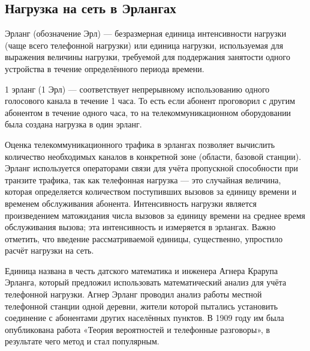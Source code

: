 \subsection{Нагрузка на сеть в Эрлангах}

Эрланг (обозначение Эрл) — безразмерная единица интенсивности нагрузки (чаще всего телефонной
нагрузки) или единица нагрузки, используемая для выражения величины нагрузки, требуемой для 
поддержания занятости одного устройства в течение определённого периода времени.

1 эрланг (1 Эрл) --- соответствует непрерывному использованию одного голосового канала в течение
1 часа. То есть если абонент проговорил с другим абонентом в течение одного часа, то на 
телекоммуникационном оборудовании была создана нагрузка в один эрланг.

Оценка телекоммуникационного трафика в эрлангах позволяет вычислить количество необходимых каналов
в конкретной зоне (области, базовой станции). Эрланг используется операторами связи для учёта 
пропускной способности при транзите трафика, так как телефонная нагрузка --- это случайная величина,
которая определяется количеством поступивших вызовов за единицу времени и временем обслуживания
абонента. Интенсивность нагрузки является произведением матожидания числа вызовов за единицу времени
на среднее время обслуживания вызова; эта интенсивность и измеряется в эрлангах. Важно отметить, что
введение рассматриваемой единицы, существенно, упростило расчёт нагрузки на сеть.

Единица названа в честь датского математика и инженера Агнера Крарупа Эрланга, который предложил
использовать математический анализ для учёта телефонной нагрузки. Агнер Эрланг проводил анализ
работы местной телефонной станции одной деревни, жители которой пытались установить соединение с
абонентами других населённых пунктов. В 1909 году им была опубликована работа «Теория вероятностей
и телефонные разговоры», в результате чего метод и стал популярным.
